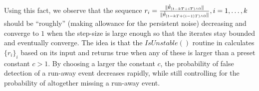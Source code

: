 Using this fact, we observe that the sequence $r_i=\frac{\| \hat{\theta}_{(t-kT+iT)\wedge 0}\|}{\| \hat{\theta}_{(t-kT+(i-1)T)\wedge 0}\|},i=1,\ldots,k$ should be ``roughly'' (making allowance for the persistent noise) decreasing and converge to $1$ when the step-size is large enough so that the iterates stay bounded and eventually converge. 
The idea is that the $IsUnstable()$ routine in  calculates $\{r_i\}_i$ based on its input and returns true when any of these is larger than a preset constant $c>1$. By choosing a larger the constant $c$, the probability of false detection of a run-away event decreases rapidly, while still controlling for the probability of altogether missing a run-away event.


